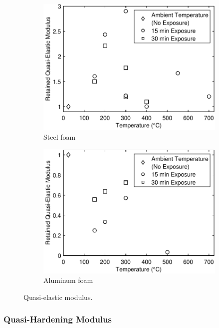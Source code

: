 \documentclass[review]{elsarticle}
\begin{document}
{\begin{figure}
	\centering
	\begin{subfigure}{0.50\textwidth}
		\centering
		\includegraphics[width=0.90\linewidth]
		{Tex-Figures/Fig17a-qElast-Fe.pdf}
		\caption{Steel foam}
		\label{fig:Quasi-elast-modulus_Steel}
	\end{subfigure}%
	\begin{subfigure}{0.50\textwidth}
		\centering
		\includegraphics[width=0.90\linewidth]
		{Tex-Figures/Fig17b-qElast-Al.pdf}
		\caption{Aluminum foam}
		\label{fig:Quasi-elast-modulus_Al}
	\end{subfigure}
	\caption{ Quasi-elastic modulus.}
	\label{fig:Quasi-elast-modulus}
\end{figure}

\subsubsection{Quasi-Hardening Modulus}

}
\end{document}
